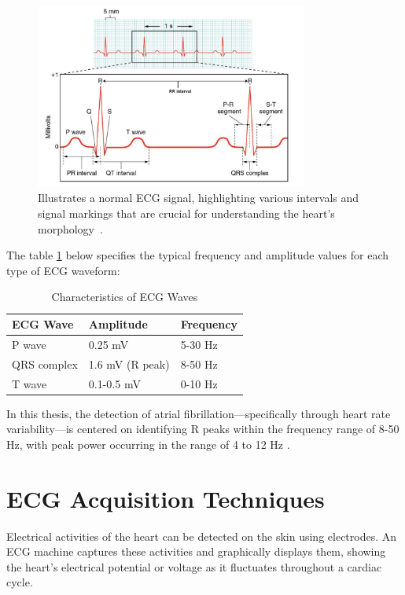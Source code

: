 \begin{figure}[h]
	\centering
	\includegraphics[width=0.8\textwidth]{images/temp}
	\caption{Illustrates a normal ECG signal, highlighting various intervals and signal markings that are crucial for understanding the heart's morphology~\cite{mamun2022}.}
	\label{fig:normal_ecg}
\end{figure}

\noindent The table \ref{tab:ecg_waves} below specifies the typical frequency and amplitude values for each type of ECG waveform:

\begin{table}[h]
	\centering
	\caption{Characteristics of ECG Waves\cite{zyout2023}}
	\begin{tabular}{|l|l|l|}
		\hline
		\textbf{ECG Wave} & \textbf{Amplitude} & \textbf{Frequency} \\ \hline
		P wave & 0.25 mV & 5-30 Hz \\ \hline
		QRS complex & 1.6 mV (R peak) & 8-50 Hz \\ \hline
		T wave & 0.1-0.5 mV & 0-10 Hz \\ \hline
	\end{tabular}
	\label{tab:ecg_waves}
\end{table}

\noindent In this thesis, the detection of atrial fibrillation—specifically through heart rate variability—is centered on identifying R peaks within the frequency range of 8-50 Hz, with peak power occurring in the range of 4 to 12 Hz \cite{murthy1978}.\\

\section{ECG Acquisition Techniques}
\vspace{1em}
\noindent Electrical activities of the heart can be detected on the skin using electrodes. An ECG machine captures these activities and graphically displays them, showing the heart's electrical potential or voltage as it fluctuates throughout a cardiac cycle.\\

